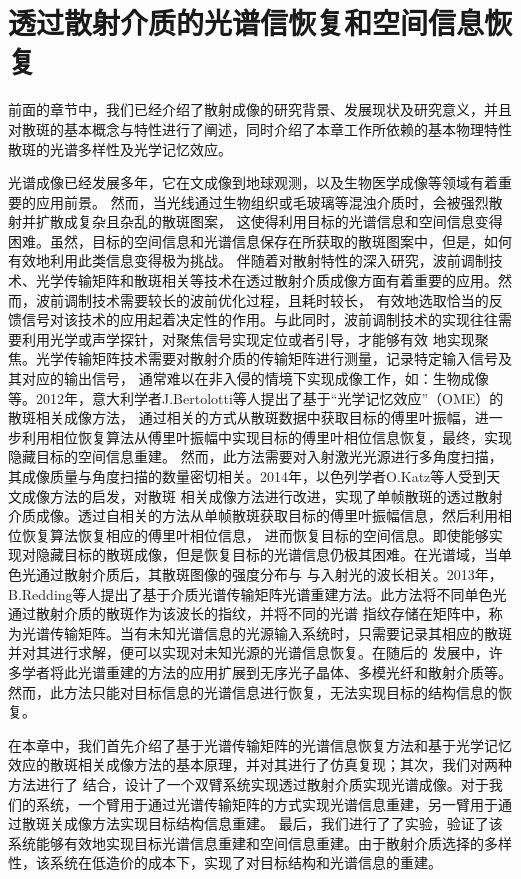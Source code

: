 
\chapter{透过散射介质的光谱信恢复和空间信息恢复}
前面的章节中，我们已经介绍了散射成像的研究背景、发展现状及研究意义，并且对散斑的基本概念与特性进行了阐述，同时介绍了本章工作所依赖的基本物理特性
散斑的光谱多样性及光学记忆效应。

光谱成像已经发展多年，它在文成像到地球观测，以及生物医学成像等领域有着重要的应用前景。
然而，当光线通过生物组织或毛玻璃等混浊介质时，会被强烈散射并扩散成复杂且杂乱的散斑图案，
这使得利用目标的光谱信息和空间信息变得困难。虽然，目标的空间信息和光谱信息保存在所获取的散斑图案中，但是，如何有效地利用此类信息变得极为挑战。
伴随着对散射特性的深入研究，波前调制技术、光学传输矩阵和散斑相关等技术在透过散射介质成像方面有着重要的应用。然而，波前调制技术需要较长的波前优化过程，且耗时较长，
有效地选取恰当的反馈信号对该技术的应用起着决定性的作用。与此同时，波前调制技术的实现往往需要利用光学或声学探针，对聚焦信号实现定位或者引导，才能够有效
地实现聚焦。光学传输矩阵技术需要对散射介质的传输矩阵进行测量，记录特定输入信号及其对应的输出信号，
通常难以在非入侵的情境下实现成像工作，如：生物成像等。2012年，意大利学者J.Bertolotti等人提出了基于“光学记忆效应”（OME）的散斑相关成像方法，
通过相关的方式从散斑数据中获取目标的傅里叶振幅，进一步利用相位恢复算法从傅里叶振幅中实现目标的傅里叶相位信息恢复，最终，实现隐藏目标的空间信息重建。
然而，此方法需要对入射激光光源进行多角度扫描，其成像质量与角度扫描的数量密切相关。2014年，以色列学者O.Katz等人受到天文成像方法的启发，对散斑
相关成像方法进行改进，实现了单帧散斑的透过散射介质成像。透过自相关的方法从单帧散斑获取目标的傅里叶振幅信息，然后利用相位恢复算法恢复相应的傅里叶相位信息，
进而恢复目标的空间信息。即使能够实现对隐藏目标的散斑成像，但是恢复目标的光谱信息仍极其困难。在光谱域，当单色光通过散射介质后，其散斑图像的强度分布与
与入射光的波长相关。2013年，B.Redding等人提出了基于介质光谱传输矩阵光谱重建方法。此方法将不同单色光通过散射介质的散斑作为该波长的指纹，并将不同的光谱
指纹存储在矩阵中，称为光谱传输矩阵。当有未知光谱信息的光源输入系统时，只需要记录其相应的散斑并对其进行求解，便可以实现对未知光源的光谱信息恢复。在随后的
发展中，许多学者将此光谱重建的方法的应用扩展到无序光子晶体、多模光纤和散射介质等。然而，此方法只能对目标信息的光谱信息进行恢复，无法实现目标的结构信息的恢复。

在本章中，我们首先介绍了基于光谱传输矩阵的光谱信息恢复方法和基于光学记忆效应的散斑相关成像方法的基本原理，并对其进行了仿真复现；其次，我们对两种方法进行了
结合，设计了一个双臂系统实现透过散射介质实现光谱成像。对于我们的系统，一个臂用于通过光谱传输矩阵的方式实现光谱信息重建，另一臂用于通过散斑关成像方法实现目标结构信息重建。
最后，我们进行了了实验，验证了该系统能够有效地实现目标光谱信息重建和空间信息重建。由于散射介质选择的多样性，该系统在低造价的成本下，实现了对目标结构和光谱信息的重建。

